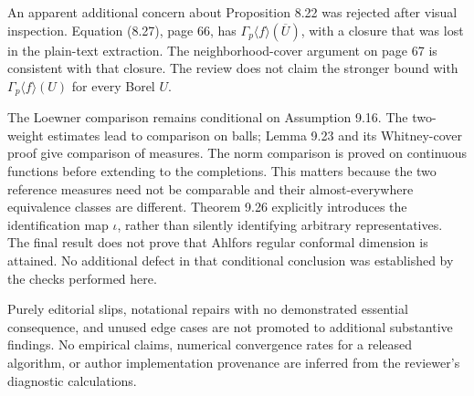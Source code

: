 \documentclass[10pt]{article}
\begin{document}
An apparent additional concern about Proposition 8.22 was rejected after visual inspection. Equation (8.27), page 66, has \(\Gamma_p\langle f\rangle(\overline U)\), with a closure that was lost in the plain-text extraction. The neighborhood-cover argument on page 67 is consistent with that closure. The review does not claim the stronger bound with \(\Gamma_p\langle f\rangle(U)\) for every Borel \(U\).\par
The Loewner comparison remains conditional on Assumption 9.16. The two-weight estimates lead to comparison on balls; Lemma 9.23 and its Whitney-cover proof give comparison of measures. The norm comparison is proved on continuous functions before extending to the completions. This matters because the two reference measures need not be comparable and their almost-everywhere equivalence classes are different. Theorem 9.26 explicitly introduces the identification map \(\iota\), rather than silently identifying arbitrary representatives. The final result does not prove that Ahlfors regular conformal dimension is attained. No additional defect in that conditional conclusion was established by the checks performed here.\par
Purely editorial slips, notational repairs with no demonstrated essential consequence, and unused edge cases are not promoted to additional substantive findings. No empirical claims, numerical convergence rates for a released algorithm, or author implementation provenance are inferred from the reviewer’s diagnostic calculations.\par
\end{document}
